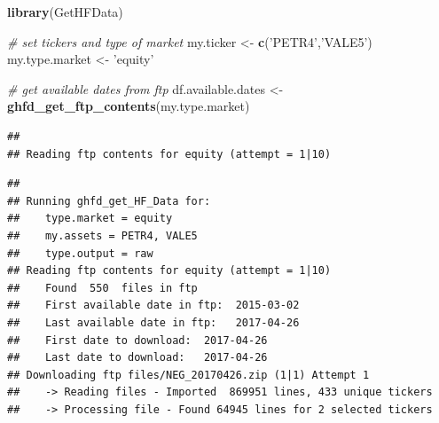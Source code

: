 \documentclass[11pt,]{book}
\newenvironment{Shaded}{\begin{snugshade}}{\end{snugshade}}
\newcommand{\KeywordTok}[1]{\textcolor[rgb]{0.27,0.27,0.27}{\textbf{#1}}}
\newcommand{\DataTypeTok}[1]{\textcolor[rgb]{0.27,0.27,0.27}{#1}}
\newcommand{\StringTok}[1]{\textcolor[rgb]{0.5,0.5,0.5}{#1}}
\newcommand{\CommentTok}[1]{\textcolor[rgb]{0.56,0.35,0.01}{\textit{#1}}}
\newcommand{\OperatorTok}[1]{\textcolor[rgb]{0.81,0.36,0.00}{\textbf{#1}}}
\newcommand{\NormalTok}[1]{#1}
\begin{document}
\begin{Shaded}
\begin{Highlighting}[]
\KeywordTok{library}\NormalTok{(GetHFData)}

\CommentTok{# set tickers and type of market}
\NormalTok{my.ticker <-}\StringTok{ }\KeywordTok{c}\NormalTok{(}\StringTok{'PETR4'}\NormalTok{,}\StringTok{'VALE5'}\NormalTok{)}
\NormalTok{my.type.market <-}\StringTok{ 'equity'}

\CommentTok{# get available dates from ftp}
\NormalTok{df.available.dates <-}\StringTok{ }\KeywordTok{ghfd_get_ftp_contents}\NormalTok{(my.type.market)}
\end{Highlighting}
\end{Shaded}

\begin{verbatim}
## 
## Reading ftp contents for equity (attempt = 1|10)
\end{verbatim}

\begin{Shaded}
\end{Shaded}

\begin{verbatim}
## 
## Running ghfd_get_HF_Data for:
##    type.market = equity
##    my.assets = PETR4, VALE5
##    type.output = raw
## Reading ftp contents for equity (attempt = 1|10)
##    Found  550  files in ftp
##    First available date in ftp:  2015-03-02
##    Last available date in ftp:   2017-04-26
##    First date to download:  2017-04-26
##    Last date to download:   2017-04-26
## Downloading ftp files/NEG_20170426.zip (1|1) Attempt 1
##    -> Reading files - Imported  869951 lines, 433 unique tickers
##    -> Processing file - Found 64945 lines for 2 selected tickers
\end{verbatim}
\end{document}
